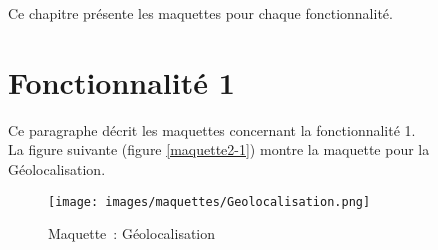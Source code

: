 Ce chapitre présente les maquettes pour chaque fonctionnalité.


\section{Fonctionnalité 1}
Ce paragraphe décrit les maquettes concernant la fonctionnalité 1. \\

La figure suivante (figure \ref{maquette2-1}) montre la maquette pour la Géolocalisation.
\begin{figure}[H]
	\centering
	\texttt{[image: images/maquettes/Geolocalisation.png]}
	\caption{Maquette~: Géolocalisation }
	\label{maquette1-1}
\end{figure}
